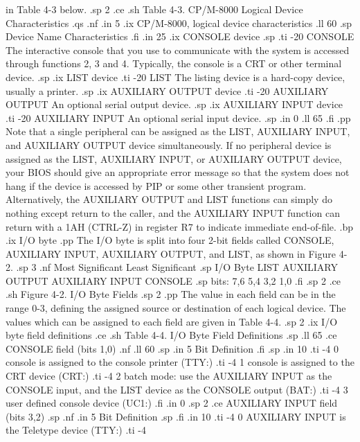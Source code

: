 in Table 4-3 below.
.sp 2
.ce
.sh
Table 4-3.  CP/M-8000 Logical Device Characteristics
.qs
.nf
.in 5
.ix CP/M-8000, logical device characteristics
.ll 60
.sp
  Device Name                 Characteristics
.fi
.in 25 
.ix CONSOLE device
.sp
.ti -20
CONSOLE             The interactive console that you use to communicate with 
the system is accessed through functions 2, 3 and 4.  Typically, the console 
is a CRT or other terminal device.
.sp
.ix LIST device
.ti -20
LIST                The listing device is a hard-copy device, usually a 
printer.
.sp
.ix AUXILIARY OUTPUT device
.ti -20
AUXILIARY OUTPUT    An optional serial output device.
.sp
.ix AUXILIARY INPUT device
.ti -20
AUXILIARY INPUT     An optional serial input device.
.sp
.in 0
.ll 65
.fi
.pp
Note that a single peripheral can be assigned as the LIST, AUXILIARY INPUT, 
and AUXILIARY OUTPUT device simultaneously.  If no peripheral device is 
assigned as the LIST, AUXILIARY INPUT, or AUXILIARY OUTPUT device, your BIOS 
should give an appropriate error message so that the system does not hang if 
the device is accessed by PIP or some other transient program.  
Alternatively, the AUXILIARY OUTPUT and LIST functions can simply do nothing
except return to the caller, and the AUXILIARY INPUT function can return with 
a 1AH (CTRL-Z) in register R7 to indicate immediate end-of-file.
.bp
.ix I/O byte
.pp
The I/O byte is split into four 2-bit fields called CONSOLE, AUXILIARY INPUT, 
AUXILIARY OUTPUT, and LIST, as shown in Figure 4-2.
.sp 3
.nf
        Most Significant		Least Significant
.sp
  I/O Byte   LIST   AUXILIARY OUTPUT   AUXILIARY INPUT  CONSOLE
.sp
   bits:      7,6           5,4               3,2          1,0
.fi
.sp 2
.ce
.sh
Figure 4-2.  I/O Byte Fields
.sp 2
.pp
The value in each field can be in the range 0-3, defining the assigned
source or destination of each logical device.  The values which can
be assigned to each field are given in Table 4-4.
.sp 2
.ix I/O byte field definitions
.ce
.sh
Table 4-4.  I/O Byte Field Definitions
.sp
.ll 65
.ce
CONSOLE field (bits 1,0)
.nf
.ll 60
.sp
.in 5 
Bit                       Definition
.fi
.sp
.in 10
.ti -4
0   console is assigned to the console printer (TTY:)
.ti -4
1   console is assigned to the CRT device (CRT:)
.ti -4
2   batch mode: use the AUXILIARY INPUT as the CONSOLE input, and the LIST 
device as the CONSOLE output (BAT:)
.ti -4
3   user defined console device (UC1:)
.fi
.in 0
.sp 2
.ce
   AUXILIARY INPUT field (bits 3,2)
.sp
.nf
.in 5
Bit                       Definition
.sp
.fi
.in 10
.ti -4
0   AUXILIARY INPUT is the Teletype device (TTY:)
.ti -4
